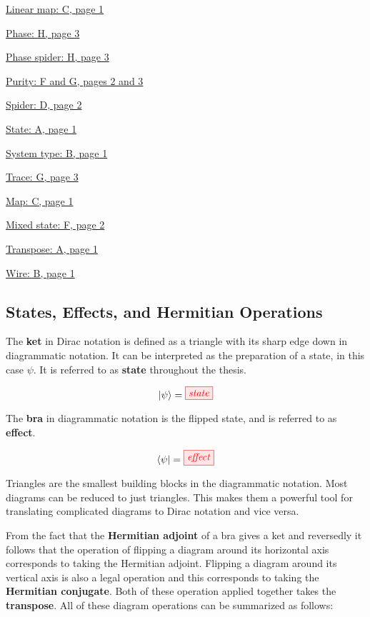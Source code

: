 \documentclass[]{article}
\begin{document}
\hyperref[maps]{Linear map: C, page 1}

\hyperref[phasespiders]{Phase: H, page 3}

\hyperref[phasespiders]{Phase spider: H, page 3}

\hyperref[doubling]{Purity: F and G, pages 2 and 3}

\hyperref[spiders]{Spider: D, page 2}

\hyperref[braandket]{State: A, page 1}

\hyperref[identity]{System type: B, page 1}

\hyperref[discarding]{Trace: G, page 3}

\hyperref[maps]{Map: C, page 1}

\hyperref[doubling]{Mixed state: F, page 2}

\hyperref[braandket]{Transpose: A, page 1}

\hyperref[identity]{Wire: B, page 1}

\subsection{States, Effects, and Hermitian Operations}

\label{braandket}
The \textbf{ket} in Dirac notation is defined as a triangle with its sharp edge down in diagrammatic notation. It can be interpreted as the preparation of a state, in this case $\psi$. It is referred to as \textbf{state} throughout the thesis.

\begin{equation}
\ket{\psi} =  \tikzfig{state}
\end{equation}

The \textbf{bra} in diagrammatic notation is the flipped state, and is referred to as \textbf{effect}. 

\begin{equation}
\bra{\psi} =  \tikzfig{effect}
\end{equation}

Triangles are the smallest building blocks in the diagrammatic notation. Most diagrams can be reduced to just triangles. This makes them a powerful tool for translating complicated diagrams to Dirac notation and vice versa.

From the fact that the \textbf{Hermitian adjoint} of a bra gives a ket and reversedly it follows that the operation of flipping a diagram around its horizontal axis corresponds to taking the Hermitian adjoint. Flipping a diagram around its vertical axis is also a legal operation and this corresponds to taking the \textbf{Hermitian conjugate}. Both of these operation applied together takes the \textbf{transpose}. All of these diagram operations can be summarized as follows:
\end{document}
